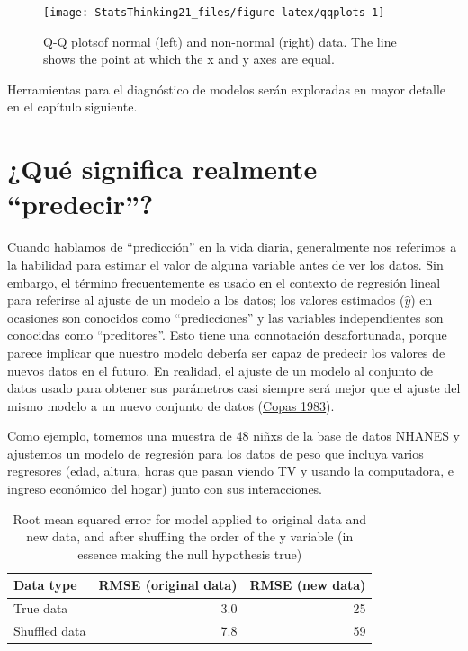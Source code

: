 \documentclass[
  12pt,
]{book}
\begin{document}
\begin{figure}
\texttt{[image: StatsThinking21\_files/figure-latex/qqplots-1]} \caption{Q-Q plotsof normal (left) and non-normal (right) data.  The line shows the point at which the x and y axes are equal.}\label{fig:qqplots}
\end{figure}

Herramientas para el diagnóstico de modelos serán exploradas en mayor detalle en el capítulo siguiente.

\hypertarget{quuxe9-significa-realmente-predecir}{%
\section{¿Qué significa realmente ``predecir''?}\label{quuxe9-significa-realmente-predecir}}

Cuando hablamos de ``predicción'' en la vida diaria, generalmente nos referimos a la habilidad para estimar el valor de alguna variable antes de ver los datos. Sin embargo, el término frecuentemente es usado en el contexto de regresión lineal para referirse al ajuste de un modelo a los datos; los valores estimados (\(\hat{y}\)) en ocasiones son conocidos como ``predicciones'' y las variables independientes son conocidas como ``preditores''. Esto tiene una connotación desafortunada, porque parece implicar que nuestro modelo debería ser capaz de predecir los valores de nuevos datos en el futuro. En realidad, el ajuste de un modelo al conjunto de datos usado para obtener sus parámetros casi siempre será mejor que el ajuste del mismo modelo a un nuevo conjunto de datos (\protect\hyperlink{ref-copa:1983}{Copas 1983}).

Como ejemplo, tomemos una muestra de 48 niñxs de la base de datos NHANES y ajustemos un modelo de regresión para los datos de peso que incluya varios regresores (edad, altura, horas que pasan viendo TV y usando la computadora, e ingreso económico del hogar) junto con sus interacciones.

\begin{table}

\caption{\label{tab:unnamed-chunk-105}Root mean squared error for model applied to original data and new data, and after shuffling the order of the y variable (in essence making the null hypothesis true)}
\centering
\begin{tabular}[t]{l|r|r}
\hline
Data type & RMSE (original data) & RMSE (new data)\\
\hline
True data & 3.0 & 25\\
\hline
Shuffled data & 7.8 & 59\\
\hline
\end{tabular}
\end{table}
\end{document}
